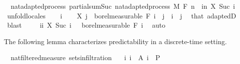 \begin{isabellebody}
%
\endisadelimdocument
{}\isamarkupfalse%
\ {\isacharparenleft}{\kern0pt}\ nat{\isacharunderscore}{\kern0pt}adapted{\isacharunderscore}{\kern0pt}process{\isacharparenright}{\kern0pt}\ partial{\isacharunderscore}{\kern0pt}sum{\isacharunderscore}{\kern0pt}Suc{\isacharcolon}{\kern0pt}\ {\isachardoublequoteopen}nat{\isacharunderscore}{\kern0pt}adapted{\isacharunderscore}{\kern0pt}process\ M\ F\ {\isacharparenleft}{\kern0pt}{\isasymlambda}n\ {\isasymxi}{\isachardot}{\kern0pt}\ {\isasymSum}i{\isacharless}{\kern0pt}n{\isachardot}{\kern0pt}\ X\ {\isacharparenleft}{\kern0pt}Suc\ i{\isacharparenright}{\kern0pt}\ {\isasymxi}{\isacharparenright}{\kern0pt}{\isachardoublequoteclose}\ \isanewline
%
\isadelimproof
%
\endisadelimproof
%
\isatagproof
{}\isamarkupfalse%
\ {\isacharparenleft}{\kern0pt}unfold{\isacharunderscore}{\kern0pt}locales{\isacharparenright}{\kern0pt}\isanewline
\ \ \isamarkupfalse%
\ i\isanewline
\ \ \isamarkupfalse%
\ {\isachardoublequoteopen}X\ j\ {\isasymin}\ borel{\isacharunderscore}{\kern0pt}measurable\ {\isacharparenleft}{\kern0pt}F\ i{\isacharparenright}{\kern0pt}{\isachardoublequoteclose}\ \ {\isachardoublequoteopen}j\ {\isasymle}\ i{\isachardoublequoteclose}\ \ j\ \isamarkupfalse%
\ that\ adaptedD\ \isamarkupfalse%
\ blast\isanewline
\ \ \isamarkupfalse%
\ {\isachardoublequoteopen}{\isacharparenleft}{\kern0pt}{\isasymlambda}{\isasymxi}{\isachardot}{\kern0pt}\ {\isasymSum}i{\isacharless}{\kern0pt}i{\isachardot}{\kern0pt}\ X\ {\isacharparenleft}{\kern0pt}Suc\ i{\isacharparenright}{\kern0pt}\ {\isasymxi}{\isacharparenright}{\kern0pt}\ {\isasymin}\ borel{\isacharunderscore}{\kern0pt}measurable\ {\isacharparenleft}{\kern0pt}F\ i{\isacharparenright}{\kern0pt}{\isachardoublequoteclose}\ \isamarkupfalse%
\ auto\isanewline
{}\isamarkupfalse%
%
\endisatagproof
{\isafoldproof}%
%
\isadelimproof
%
\endisadelimproof
%
\begin{isamarkuptext}%
The following lemma characterizes predictability in a discrete-time setting.%
\end{isamarkuptext}\isamarkuptrue%
\isamarkupfalse%
\ {\isacharparenleft}{\kern0pt}\ nat{\isacharunderscore}{\kern0pt}filtered{\isacharunderscore}{\kern0pt}measure{\isacharparenright}{\kern0pt}\ sets{\isacharunderscore}{\kern0pt}in{\isacharunderscore}{\kern0pt}filtration{\isacharcolon}{\kern0pt}\isanewline
\ \ \ {\isachardoublequoteopen}{\isacharparenleft}{\kern0pt}{\isasymUnion}i{\isachardot}{\kern0pt}\ {\isacharbraceleft}{\kern0pt}i{\isacharbraceright}{\kern0pt}\ {\isasymtimes}\ A\ i{\isacharparenright}{\kern0pt}\ {\isasymin}\ {\isasymSigma}\isactrlsub P{\isachardoublequoteclose}\isanewline

\end{isabellebody}
